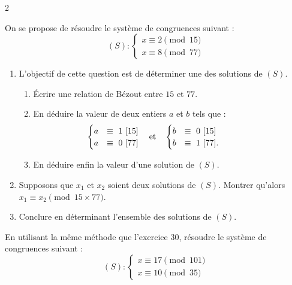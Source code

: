 \documentclass[a4paper,12pt]{article}
\begin{document}
\begin{multicols}{2}
\begin{exercice}[title=Exercice 30 $\quad \star \star \star \quad$ { [Calculer, Chercher, Raisonner] }]{}{}
    On se propose de résoudre le système de congruences suivant :
    \[
    (S) : 
    \begin{cases} 
    x \equiv 2 \pmod{15} \\
    x \equiv 8 \pmod{77}
    \end{cases}
    \]
    \begin{enumerate}
        \item L’objectif de cette question est de déterminer une des solutions de $(S)$.
        \begin{enumerate}
            \item Écrire une relation de Bézout entre $15$ et $77$.
            \item En déduire la valeur de deux entiers $a$ et $b$ tels que :
            \[
            \hspace{-4em}\begin{cases}
            a &\equiv\ 1\ [15] \\
            a &\equiv\ 0\ [77]
            \end{cases}
            \quad \text{et} \quad 
            \begin{cases}
            b &\equiv\ 0\ [15] \\
            b &\equiv\ 1\ [77].
            \end{cases}
            \]
            \item En déduire enfin la valeur d’une solution de $(S)$.
        \end{enumerate}
        \item Supposons que $x_1$ et $x_2$ soient deux solutions de $(S)$. Montrer qu’alors $x_1 \equiv x_2 \pmod{15 \times 77}$.
        \item Conclure en déterminant l’ensemble des solutions de $(S)$.
    \end{enumerate}
    \end{exercice}
    
    \begin{exercice}[title=Exercice 31 $\quad \star \star \quad$ { [Calculer, Raisonner] }]{}{}
    En utilisant la même méthode que l’exercice 30, résoudre le système de congruences suivant :
    \[
    (S) : 
    \begin{cases} 
    x \equiv 17 \pmod{101} \\
    x \equiv 10 \pmod{35}
    \end{cases}
    \]
    \end{exercice}
    

\end{multicols}
\end{document}
